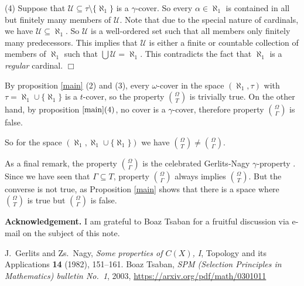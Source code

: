 \documentclass[12pt]{amsart}
\gdef\cal{\mathcal}
\gdef\a{\aleph_1}
\begin{document}
(4) Suppose that ${\cal U}\subseteq \tau\setminus\{\a\}$ is
a $\gamma$-cover. So every $\alpha\in\a$ is contained in all
but finitely many members of ${\cal U}$. Note that due to the
special nature of cardinals, we have ${\cal U}\subseteq \a$.
So ${\cal U}$ is a well-ordered set such that all members
only finitely many predecessors. This implies that ${\cal U}$
is either a finite or countable collection of members
of $\a$ such that $\bigcup{\cal U} = \a$.
This contradicts the fact that $\a$ is a {\em regular} cardinal.
$\Box$

By proposition \ref{main} (2) and (3), every $\omega$-cover in the space
$(\a,\tau)$ with $\tau = \a\cup\{\a\}$ is a $t$-cover, so the
property ${\Omega \choose T}$ is trivially true. On the
other hand, by proposition $\ref{main} (4)$, no cover is a $\gamma$-cover,
therefore property ${\Omega\choose \Gamma}$ is false.

So for the space $(\a, \a\cup\{\a\})$ we have ${\Omega\choose T} \neq
{\Omega\choose \Gamma}$.

As a final remark, the property ${\Omega\choose\Gamma}$
is the celebrated Gerlits-Nagy $\gamma$-property \cite{gamma}.
Since we have seen that $\Gamma \subseteq T$, property ${\Omega\choose
\Gamma}$ always implies ${\Omega \choose T}$. But the
converse is not true, as Proposition
\ref{main} shows that there is a space where ${\Omega\choose T}$ is
true but ${\Omega\choose \Gamma}$ is false.

{\bf Acknowledgement.} I am grateful to Boaz Tsaban for a fruitful
discussion via e-mail on the subject of this note.

\begin{thebibliography}{9}
   J.~Gerlits and Zs.~Nagy, {\it Some properties of
    $C(X)$, I}, Topology and its Applications {\bf 14} (1982), 151–161.
   Boaz Tsaban, {\it SPM (Selection Principles in Mathematics)
    bulletin No.~1}, 2003, \url{https://arxiv.org/pdf/math/0301011}
\end{thebibliography}
\end{document}
